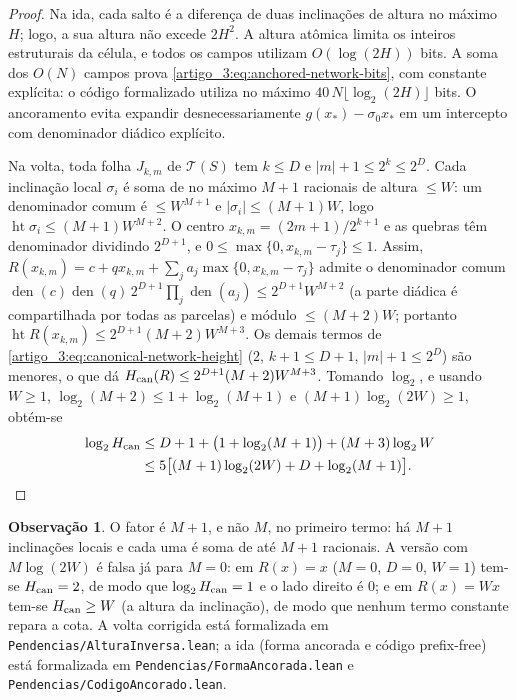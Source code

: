 \documentclass[12pt,a4paper]{article}
\theoremstyle{preciso}
\theoremstyle{definition}
\theoremstyle{preciso}
\theoremstyle{preciso}
\theoremstyle{preciso}
\theoremstyle{preciso}
\theoremstyle{definition}
\theoremstyle{preciso}
\theoremstyle{definition}
\theoremstyle{preciso}
\theoremstyle{preciso}
\theoremstyle{definition}
\newtheorem*{observacaoSN}{Observação}
\begin{document}
\begin{proof}
Na ida, cada salto é a diferença de duas inclinações de altura no máximo
$H$; logo, a sua altura não excede $2H^2$. A altura atômica limita os inteiros
estruturais da célula, e todos os campos utilizam $O(\log(2H))$ bits. A soma dos
$O(N)$ campos prova \eqref{artigo_3:eq:anchored-network-bits}, com constante explícita:
o código formalizado utiliza no máximo $40\,N\lfloor\log_2(2H)\rfloor$ bits. O ancoramento evita
expandir desnecessariamente $g(x_*)-\sigma_0x_*$ em um intercepto com
denominador diádico explícito.

Na volta, toda folha $J_{k,m}$ de $\mathcal T(S)$ tem $k\le D$ e
$|m|+1\le 2^k\le 2^D$. Cada inclinação local $\sigma_i$ é soma de no máximo $M+1$
racionais de altura $\le W$: um denominador comum é $\le W^{M+1}$ e
$|\sigma_i|\le(M+1)W$, logo $\operatorname{ht}\sigma_i\le (M+1)W^{M+2}$. O centro
$x_{k,m}=(2m+1)/2^{k+1}$ e as quebras têm denominador dividindo $2^{D+1}$, e
$0\le \max\{0,x_{k,m}-\tau_j\}\le1$. Assim, $R(x_{k,m})=c+qx_{k,m}+\sum_j
a_j\max\{0,x_{k,m}-\tau_j\}$ admite o denominador comum
$\operatorname{den}(c)\operatorname{den}(q)\,2^{D+1}\prod_j\operatorname{den}(a_j)\le
2^{D+1}W^{M+2}$ (a parte diádica é compartilhada por todas as parcelas) e módulo
$\le (M+2)W$; portanto $\operatorname{ht}R(x_{k,m})\le 2^{D+1}(M+2)W^{M+3}$. Os
demais termos de \eqref{artigo_3:eq:canonical-network-height} ($2$, $k+1\le D+1$,
$|m|+1\le 2^D$) são menores, o que dá $H_{\rm can}(R)\le 2^{D+1}(M+2)W^{M+3}$.
Tomando $\log_2$, e usando $W\ge1$, $\log_2(M+2)\le 1+\log_2(M+1)$ e
$(M+1)\log_2(2W)\ge1$, obtém-se
\begin{align*}
 \log_2 H_{\rm can}
 &\le D+1+\bigl(1+\log_2(M+1)\bigr)+(M+3)\log_2 W\\
 &\le 5\bigl[(M+1)\log_2(2W)+D+\log_2(M+1)\bigr].
\end{align*}
\end{proof}

\begin{observacaoSN}\label{artigo_3:rem:reverse-height-correction}
O fator é $M+1$, e não $M$, no primeiro termo: há $M+1$ inclinações locais e
cada uma é soma de até $M+1$ racionais. A versão com $M\log(2W)$ é falsa já para
$M=0$: em $R(x)=x$ ($M=0$, $D=0$, $W=1$) tem-se $H_{\rm can}=2$, de modo que
$\log_2 H_{\rm can}=1$ e o lado direito é $0$; e em $R(x)=Wx$ tem-se
$H_{\rm can}\ge W$ (a altura da inclinação), de modo que nenhum termo constante
repara a cota. A volta corrigida está formalizada em
\texttt{Pendencias/AlturaInversa.lean}; a ida (forma ancorada e código prefix-free)
está formalizada em \texttt{Pendencias/FormaAncorada.lean} e
\texttt{Pendencias/CodigoAncorado.lean}.
\end{observacaoSN}
\end{document}
